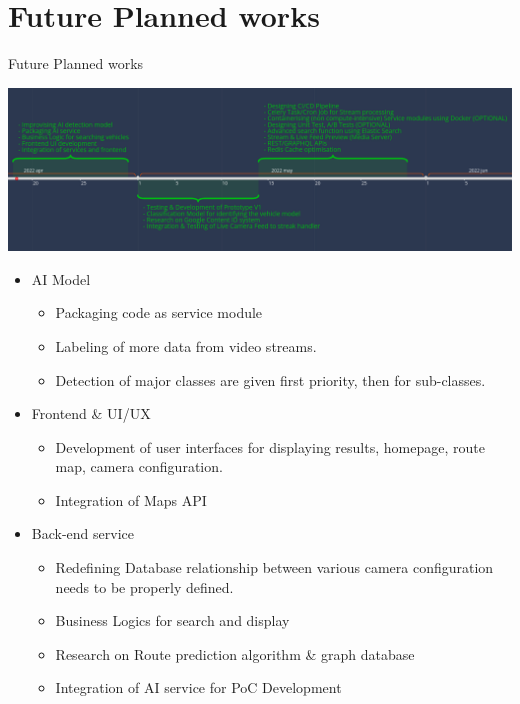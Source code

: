 \documentclass{beamer}
\begin{document}
	\section{Future Planned works}
	\begin{frame}[allowframebreaks]{Future Planned works}

		\begin{center}
			\includegraphics[width=1\linewidth]{res/time_line_future}
		\end{center}
		
		\begin{itemize}
			\item AI Model \\
			\begin{itemize}
				\item Packaging code as service module
				\item Labeling of more data from video streams.
				\item Detection of major classes are given first priority, then for sub-classes.
			\end{itemize}
			
			\item Frontend \& UI/UX\\
			\begin{itemize}
				\item Development of user interfaces for displaying results, homepage, route map, camera configuration.
				\item Integration of Maps API
			\end{itemize}

			\newpage

			\item Back-end service\\
			\begin{itemize}
				\item Redefining Database relationship between various camera configuration needs to be properly defined.
				\item Business Logics for search and display
				\item Research on Route prediction algorithm \& graph database
				\item Integration of AI service for PoC Development
			\end{itemize}
		\end{itemize}
	\end{frame}
\end{document}
